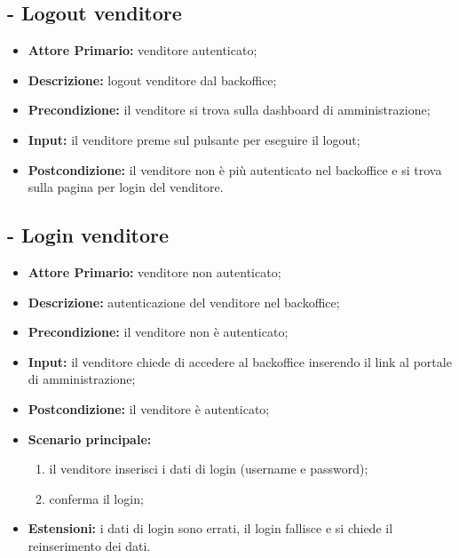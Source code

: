 \stepUserCase
\subsection{ - Logout venditore}
\begin{itemize}
    \item \textbf{Attore Primario:} venditore autenticato;
    \item \textbf{Descrizione:} logout venditore dal backoffice;
    \item \textbf{Precondizione:} il venditore si trova sulla dashboard di amministrazione;
    \item \textbf{Input:} il venditore preme sul pulsante per eseguire il logout;
    \item \textbf{Postcondizione:} il venditore non è più autenticato nel backoffice e si trova sulla pagina per login del venditore.
\end{itemize}

\stepUserCase
\subsection{ - Login venditore}
\begin{itemize}
    \item \textbf{Attore Primario:} venditore non autenticato;
    \item \textbf{Descrizione:} autenticazione del venditore nel backoffice;
    \item \textbf{Precondizione:} il venditore non è autenticato;
    \item \textbf{Input:} il venditore chiede di accedere al backoffice inserendo il link al portale di amministrazione;
    \item \textbf{Postcondizione:} il venditore è autenticato;
    \item \textbf{Scenario principale:}
    \begin{enumerate}
        \item il venditore inserisci i dati di login (username e password);
        \item conferma il login;
    \end{enumerate}
    \item \textbf{Estensioni:} i dati di login sono errati, il login fallisce e si chiede il reinserimento dei dati.
\end{itemize}